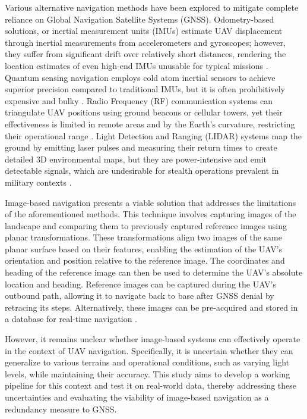 Various alternative navigation methods have been explored to mitigate complete reliance on Global Navigation Satellite Systems (GNSS). Odometry-based solutions, or inertial measurement units (IMUs) estimate UAV displacement through inertial measurements from accelerometers and gyroscopes; however, they suffer from significant drift over relatively short distances, rendering the location estimates of even high-end IMUs unusable for typical missions \cite{Zhuang2023}. Quantum sensing navigation employs cold atom inertial sensors to achieve superior precision compared to traditional IMUs, but it is often prohibitively expensive and bulky \cite{wright2022cold}. Radio Frequency (RF) communication systems can triangulate UAV positions using ground beacons or cellular towers, yet their effectiveness is limited in remote areas and by the Earth's curvature, restricting their operational range \cite{brewer_line_2024}. Light Detection and Ranging (LIDAR) systems map the ground by emitting laser pulses and measuring their return times to create detailed 3D environmental maps, but they are power-intensive and emit detectable signals, which are undesirable for stealth operations prevalent in military contexts \cite{scoutaerial2024lidar}.

Image-based navigation presents a viable solution that addresses the limitations of the aforementioned methods. This technique involves capturing images of the landscape and comparing them to previously captured reference images using planar transformations. These transformations align two images of the same planar surface based on their features, enabling the estimation of the UAV's orientation and position relative to the reference image. The coordinates and heading of the reference image can then be used to determine the UAV's absolute location and heading. Reference images can be captured during the UAV's outbound path, allowing it to navigate back to base after GNSS denial by retracing its steps. Alternatively, these images can be pre-acquired and stored in a database for real-time navigation \cite{arafat2023vision}.


However, it remains unclear whether image-based systems can effectively operate in the context of UAV navigation. Specifically, it is uncertain whether they can generalize to various terrains and operational conditions, such as varying light levels, while maintaining their accuracy. This study aims to develop a working pipeline for this context and test it on real-world data, thereby addressing these uncertainties and evaluating the viability of image-based navigation as a redundancy measure to GNSS.



